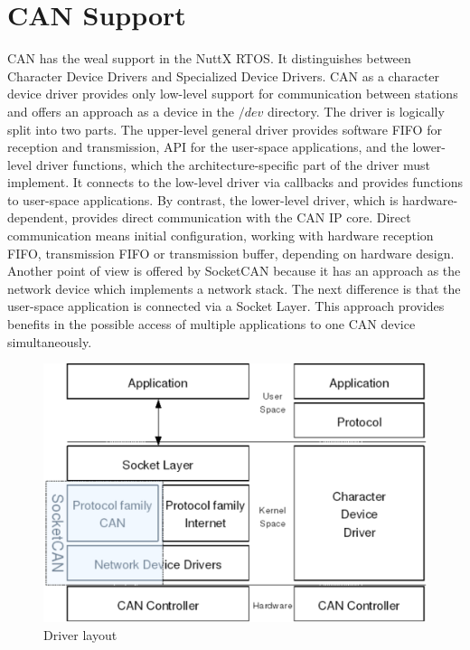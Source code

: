\documentclass{ctuthesis}
\begin{document}
 \section{CAN Support}
 CAN has the weal support in the NuttX RTOS. It distinguishes between Character Device Drivers and Specialized Device Drivers. CAN as a character device driver provides only low-level support for communication between stations and offers an approach as a device in the $/dev$ directory. The driver is logically split into two parts. The upper-level general driver provides software FIFO for reception and transmission, API for the user-space applications, and the lower-level driver functions, which the architecture-specific part of the driver must implement. It connects to the low-level driver via callbacks and provides functions to user-space applications. By contrast, the lower-level driver, which is hardware-dependent, provides direct communication with the CAN IP core. Direct communication means initial configuration, working with hardware reception FIFO, transmission FIFO or transmission buffer, depending on hardware design. Another point of view is offered by SocketCAN because it has an approach as the network device which implements a network stack\cite{can_subsystem}. The next difference is that the user-space application is connected via a Socket Layer. This approach  provides benefits in the possible access of multiple applications to one CAN device simultaneously.
 
 \begin{figure}[htb]
 \includegraphics[width=1\textwidth]{images/Socketcan_official.pdf}
 \caption{Driver layout \cite{socketcan}}
 \end{figure}
 
\end{document}
